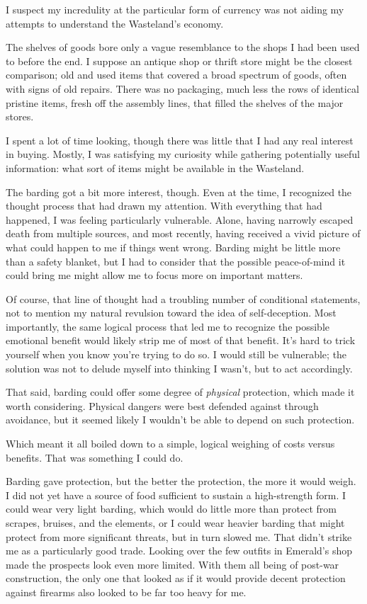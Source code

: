 I suspect my incredulity at the particular form of currency was not aiding my attempts to understand the Wasteland’s economy.

The shelves of goods bore only a vague resemblance to the shops I had been used to before the end. I suppose an antique shop or thrift store might be the closest comparison; old and used items that covered a broad spectrum of goods, often with signs of old repairs. There was no packaging, much less the rows of identical pristine items, fresh off the assembly lines, that filled the shelves of the major stores.

I spent a lot of time looking, though there was little that I had any real interest in buying. Mostly, I was satisfying my curiosity while gathering potentially useful information: what sort of items might be available in the Wasteland.

The barding got a bit more interest, though. Even at the time, I recognized the thought process that had drawn my attention. With everything that had happened, I was feeling particularly vulnerable. Alone, having narrowly escaped death from multiple sources, and most recently, having received a vivid picture of what could happen to me if things went wrong. Barding might be little more than a safety blanket, but I had to consider that the possible peace-of-mind it could bring me might allow me to focus more on important matters.

Of course, that line of thought had a troubling number of conditional statements, not to mention my natural revulsion toward the idea of self-deception. Most importantly, the same logical process that led me to recognize the possible emotional benefit would likely strip me of most of that benefit. It’s hard to trick yourself when you know you’re trying to do so. I would still be vulnerable; the solution was not to delude myself into thinking I wasn’t, but to act accordingly.

That said, barding could offer some degree of \textit{physical} protection, which made it worth considering. Physical dangers were best defended against through avoidance, but it seemed likely I wouldn’t be able to depend on such protection.

Which meant it all boiled down to a simple, logical weighing of costs versus benefits. That was something I could do.

Barding gave protection, but the better the protection, the more it would weigh. I did not yet have a source of food sufficient to sustain a high-strength form. I could wear very light barding, which would do little more than protect from scrapes, bruises, and the elements, or I could wear heavier barding that might protect from more significant threats, but in turn slowed me. That didn’t strike me as a particularly good trade. Looking over the few outfits in Emerald’s shop made the prospects look even more limited. With them all being of post-war construction, the only one that looked as if it would provide decent protection against firearms also looked to be far too heavy for me.

